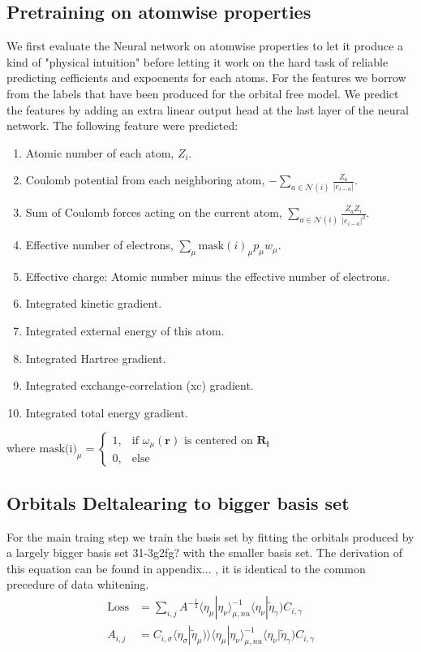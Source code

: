 \subsection{Pretraining on atomwise properties}
We first evaluate the Neural network on atomwise properties to let it produce a kind of "physical intuition" before letting it work on the hard task of reliable predicting cefficients and expoenents for each atoms. For the features we borrow from the labels that have been produced for the orbital free model.
We predict the features by adding an extra linear output head at the last layer of the neural network. 
The following feature were predicted:
\begin{enumerate}
    \item Atomic number of each atom, $Z_i$.
    \item Coulomb potential from each neighboring atom, $-\sum\limits_{a \in \mathcal{N}(i)} \frac{Z_a}{|e_{i-a}|}$.
    \item Sum of Coulomb forces acting on the current atom, $\sum\limits_{a \in \mathcal{N}(i)} \frac{Z_a Z_i}{|e_{i-a}|^2}$.
    \item Effective number of electrons, $\sum\limits_{\mu} \text{mask}(i)_\mu p_\mu w_\mu$.
    \item Effective charge: Atomic number minus the effective number of electrons.
    \item Integrated kinetic gradient.
    \item Integrated external energy of this atom.
    \item Integrated Hartree gradient.
    \item Integrated exchange-correlation (xc) gradient.
    \item Integrated total energy gradient.
\end{enumerate}
where $\text{mask(i)}_\mu =
\begin{cases}
1, & \text{if } \omega_\mu(\mathbf{r}) \text{ is centered on } \mathbf{R_i} \\
0, & \text{else}
\end{cases}$

\subsection{Orbitals Deltalearing to bigger basis set}
For the main traing step we train the basis set by fitting the orbitals produced by a largely bigger basis set 31-3g2fg? with the smaller basis set.
The derivation of this equation can be found in appendix... , it is identical to the common precedure of data whitening.
\begin{align}
    \text{Loss} &= \sum_{i,j} A^{-\frac{1}{2}} \langle\eta_\mu|\eta_\nu\rangle^{-1}_{\mu,nu} \langle\eta_\nu|\tilde\eta_\gamma) C_{i,\gamma}\\
    A_{i,j}&=C_{i,\sigma}\langle\eta_\sigma|\tilde\eta_\mu)\rangle \langle\eta_\mu|\eta_\nu\rangle^{-1}_{\mu,nu} \langle\eta_\nu|\tilde\eta_\gamma) C_{i,\gamma}\\
\end{align}





